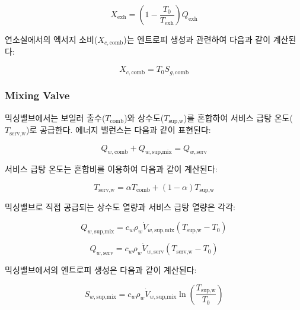 \documentclass[final,5p,times,twocolumn,authoryear]{elsarticle}
\begin{document}
\begin{equation}
\label{eq:gb_x_exh}
X_{\text{exh}} = \left(1 - \frac{T_0}{T_{\text{exh}}}\right) Q_{\text{exh}}
\end{equation}

연소실에서의 엑서지 소비($X_{c,\text{comb}}$)는 엔트로피 생성과 관련하여 다음과 같이 계산된다:

\begin{equation}
\label{eq:gb_xc_comb}
X_{c,\text{comb}} = T_0 S_{g,\text{comb}}
\end{equation}

\subsubsection{Mixing Valve}

믹싱밸브에서는 보일러 출수($T_{\text{comb}}$)와 상수도($T_{\text{sup,w}}$)를 혼합하여 서비스 급탕 온도($T_{\text{serv,w}}$)로 공급한다. 에너지 밸런스는 다음과 같이 표현된다:

\begin{equation}
\label{eq:gb_energy_mix}
Q_{w,\text{comb}} + Q_{w,\text{sup,mix}} = Q_{w,\text{serv}}
\end{equation}

서비스 급탕 온도는 혼합비를 이용하여 다음과 같이 계산된다:

\begin{equation}
\label{eq:gb_t_serv}
T_{\text{serv,w}} = \alpha T_{\text{comb}} + (1 - \alpha) T_{\text{sup,w}}
\end{equation}

믹싱밸브로 직접 공급되는 상수도 열량과 서비스 급탕 열량은 각각:

\begin{equation}
\label{eq:gb_qw_sup_mix}
Q_{w,\text{sup,mix}} = c_w \rho_w \dot{V}_{w,\text{sup,mix}} (T_{\text{sup,w}} - T_0)
\end{equation}

\begin{equation}
\label{eq:gb_qw_serv}
Q_{w,\text{serv}} = c_w \rho_w \dot{V}_{w,\text{serv}} (T_{\text{serv,w}} - T_0)
\end{equation}

믹싱밸브에서의 엔트로피 생성은 다음과 같이 계산된다:

\begin{equation}
\label{eq:gb_s_w_sup_mix}
S_{w,\text{sup,mix}} = c_w \rho_w \dot{V}_{w,\text{sup,mix}} \ln\left(\frac{T_{\text{sup,w}}}{T_0}\right)
\end{equation}
\end{document}
